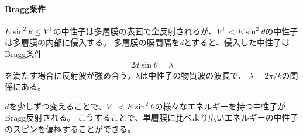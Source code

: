 \paragraph{Bragg条件}
$E\sin^2\theta\leq V^+$の中性子は多層膜の表面で全反射されるが、$V^+<E\sin^2\theta$の中性子は多層膜の内部に侵入する。
多層膜の膜間隔を$d$とすると、侵入した中性子はBragg条件
\begin{align}
2d\sin\theta=\lambda
\end{align}
を満たす場合に反射波が強め合う。$\lambda$は中性子の物質波の波長で、
$\lambda=2\pi/k$の関係にある。

$d$を少しずつ変えることで、$V^+<E\sin^2\theta$の様々なエネルギーを持つ中性子がBragg反射される。
こうすることで、単層膜に比べより広いエネルギーの中性子のスピンを偏極することができる。
